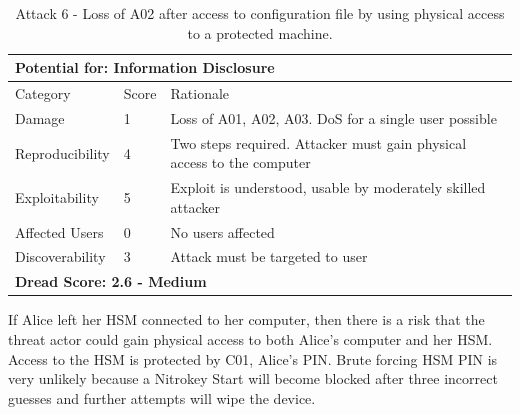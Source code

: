 \documentclass [11pt, proquest] {uwthesis}[2020/02/24]
\begin{document}
\begin{table}[H]
\begin{tabular}{|m{3cm}|m{1cm}|p{27em} |}
\multicolumn{3}{l}{Potential for: Information Disclosure}                   \\
\hline
Category & Score & Rationale \\
\hline
Damage          & 1     & Loss of A01, A02, A03. DoS for a single user possible            \\
\hline
Reproducibility & 4     & Two steps required. Attacker must gain physical access to the computer     \\
\hline
Exploitability & 5      & Exploit is understood, usable by moderately skilled attacker  \\
\hline
Affected Users  & 0     &  No users affected                          \\
\hline
Discoverability & 3     & Attack must be targeted to user \\
\hline
\multicolumn{3}{l}{\textbf{Dread Score: 2.6 - Medium}} 
\end{tabular}
\caption{Attack 6 - Loss of A02 after access to configuration file by using physical access to a protected machine.}
\label{hsm:attack6}
\end{table}

If Alice left her HSM connected to her computer, then there is a risk that the threat actor could gain physical access to both Alice's computer and her HSM. Access to the HSM is protected by C01, Alice's PIN. Brute forcing HSM PIN is very unlikely because a Nitrokey Start will become blocked after three incorrect guesses and further attempts will wipe the device.
\end{document}
